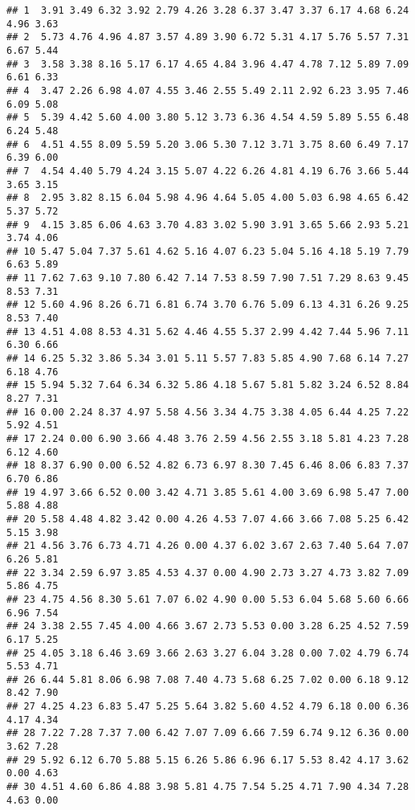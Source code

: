 \documentclass[
]{article}
\begin{document}
\begin{verbatim}
## 1  3.91 3.49 6.32 3.92 2.79 4.26 3.28 6.37 3.47 3.37 6.17 4.68 6.24 4.96 3.63
## 2  5.73 4.76 4.96 4.87 3.57 4.89 3.90 6.72 5.31 4.17 5.76 5.57 7.31 6.67 5.44
## 3  3.58 3.38 8.16 5.17 6.17 4.65 4.84 3.96 4.47 4.78 7.12 5.89 7.09 6.61 6.33
## 4  3.47 2.26 6.98 4.07 4.55 3.46 2.55 5.49 2.11 2.92 6.23 3.95 7.46 6.09 5.08
## 5  5.39 4.42 5.60 4.00 3.80 5.12 3.73 6.36 4.54 4.59 5.89 5.55 6.48 6.24 5.48
## 6  4.51 4.55 8.09 5.59 5.20 3.06 5.30 7.12 3.71 3.75 8.60 6.49 7.17 6.39 6.00
## 7  4.54 4.40 5.79 4.24 3.15 5.07 4.22 6.26 4.81 4.19 6.76 3.66 5.44 3.65 3.15
## 8  2.95 3.82 8.15 6.04 5.98 4.96 4.64 5.05 4.00 5.03 6.98 4.65 6.42 5.37 5.72
## 9  4.15 3.85 6.06 4.63 3.70 4.83 3.02 5.90 3.91 3.65 5.66 2.93 5.21 3.74 4.06
## 10 5.47 5.04 7.37 5.61 4.62 5.16 4.07 6.23 5.04 5.16 4.18 5.19 7.79 6.63 5.89
## 11 7.62 7.63 9.10 7.80 6.42 7.14 7.53 8.59 7.90 7.51 7.29 8.63 9.45 8.53 7.31
## 12 5.60 4.96 8.26 6.71 6.81 6.74 3.70 6.76 5.09 6.13 4.31 6.26 9.25 8.53 7.40
## 13 4.51 4.08 8.53 4.31 5.62 4.46 4.55 5.37 2.99 4.42 7.44 5.96 7.11 6.30 6.66
## 14 6.25 5.32 3.86 5.34 3.01 5.11 5.57 7.83 5.85 4.90 7.68 6.14 7.27 6.18 4.76
## 15 5.94 5.32 7.64 6.34 6.32 5.86 4.18 5.67 5.81 5.82 3.24 6.52 8.84 8.27 7.31
## 16 0.00 2.24 8.37 4.97 5.58 4.56 3.34 4.75 3.38 4.05 6.44 4.25 7.22 5.92 4.51
## 17 2.24 0.00 6.90 3.66 4.48 3.76 2.59 4.56 2.55 3.18 5.81 4.23 7.28 6.12 4.60
## 18 8.37 6.90 0.00 6.52 4.82 6.73 6.97 8.30 7.45 6.46 8.06 6.83 7.37 6.70 6.86
## 19 4.97 3.66 6.52 0.00 3.42 4.71 3.85 5.61 4.00 3.69 6.98 5.47 7.00 5.88 4.88
## 20 5.58 4.48 4.82 3.42 0.00 4.26 4.53 7.07 4.66 3.66 7.08 5.25 6.42 5.15 3.98
## 21 4.56 3.76 6.73 4.71 4.26 0.00 4.37 6.02 3.67 2.63 7.40 5.64 7.07 6.26 5.81
## 22 3.34 2.59 6.97 3.85 4.53 4.37 0.00 4.90 2.73 3.27 4.73 3.82 7.09 5.86 4.75
## 23 4.75 4.56 8.30 5.61 7.07 6.02 4.90 0.00 5.53 6.04 5.68 5.60 6.66 6.96 7.54
## 24 3.38 2.55 7.45 4.00 4.66 3.67 2.73 5.53 0.00 3.28 6.25 4.52 7.59 6.17 5.25
## 25 4.05 3.18 6.46 3.69 3.66 2.63 3.27 6.04 3.28 0.00 7.02 4.79 6.74 5.53 4.71
## 26 6.44 5.81 8.06 6.98 7.08 7.40 4.73 5.68 6.25 7.02 0.00 6.18 9.12 8.42 7.90
## 27 4.25 4.23 6.83 5.47 5.25 5.64 3.82 5.60 4.52 4.79 6.18 0.00 6.36 4.17 4.34
## 28 7.22 7.28 7.37 7.00 6.42 7.07 7.09 6.66 7.59 6.74 9.12 6.36 0.00 3.62 7.28
## 29 5.92 6.12 6.70 5.88 5.15 6.26 5.86 6.96 6.17 5.53 8.42 4.17 3.62 0.00 4.63
## 30 4.51 4.60 6.86 4.88 3.98 5.81 4.75 7.54 5.25 4.71 7.90 4.34 7.28 4.63 0.00
\end{verbatim}
\end{document}
